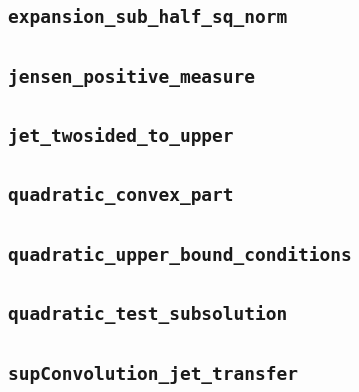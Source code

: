 \documentclass[11pt]{amsart}
\theoremstyle{definition}
\begin{document}
\subsection{\texorpdfstring{\texttt{expansion\_sub\_half\_sq\_norm}}{expansion_sub_half_sq_norm}}\label{node:expansion_sub_half_sq_norm}


\subsection{\texorpdfstring{\texttt{jensen\_positive\_measure}}{jensen_positive_measure}}\label{node:jensen_positive_measure}


\subsection{\texorpdfstring{\texttt{jet\_twosided\_to\_upper}}{jet_twosided_to_upper}}\label{node:jet_twosided_to_upper}


\subsection{\texorpdfstring{\texttt{quadratic\_convex\_part}}{quadratic_convex_part}}\label{node:quadratic_convex_part}


\subsection{\texorpdfstring{\texttt{quadratic\_upper\_bound\_conditions}}{quadratic_upper_bound_conditions}}\label{node:quadratic_upper_bound_conditions}


\subsection{\texorpdfstring{\texttt{quadratic\_test\_subsolution}}{quadratic_test_subsolution}}\label{node:quadratic_test_subsolution}


\subsection{\texorpdfstring{\texttt{supConvolution\_jet\_transfer}}{supConvolution_jet_transfer}}\label{node:supConvolution_jet_transfer}

\end{document}
